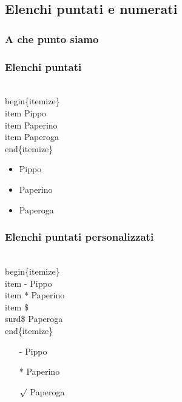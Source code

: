 \documentclass[svgnames,%
	ucs,%
	pdftex]{guitbeamer}
\begin{document}
\subsection{Elenchi puntati e numerati}
\begin{frame}
  \frametitle{A che punto siamo}
\end{frame}
\begin{frame}
  \frametitle{Elenchi puntati}
	\begin{LaTeXcode}
		\\begin\{\alert{itemize}\}\n
		\hspace*{5ex}\\item Pippo\n
		\hspace*{5ex}\\item Paperino\n
		\hspace*{5ex}\\item Paperoga\n
		\\end\{\alert{itemize}\}
	\end{LaTeXcode}
	\begin{LaTeXoutput}
		\begin{itemize}
			\item Pippo
			\item Paperino
			\item Paperoga
		\end{itemize}
	\end{LaTeXoutput}
\end{frame}
\begin{frame}
  \frametitle{Elenchi puntati personalizzati}
	\begin{LaTeXcode}
		\\begin\{\alert{itemize}\}\n
		\hspace*{5ex}\\item[-] Pippo \n
		\hspace*{5ex}\\item[*] Paperino \n
		\hspace*{5ex}\\item[\$\\surd\$] Paperoga \n
		\\end\{\alert{itemize}\}
	\end{LaTeXcode}
	\begin{LaTeXoutput}
		\begin{itemize}
			\item[-] Pippo 
			\item[*] Paperino
			\item[$\surd$] Paperoga
		\end{itemize}
	\end{LaTeXoutput}
\end{frame}
\end{document}
